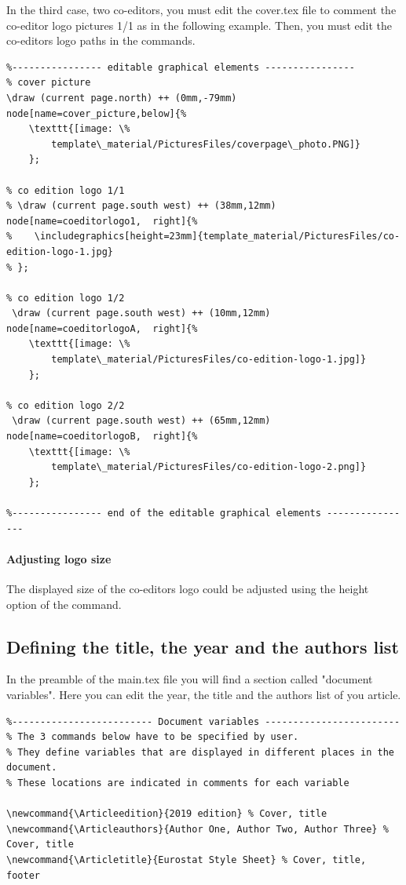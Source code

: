 \documentclass[Theme1]{{template_material/eurostat}}
\newcommand{\Articleedition}{2020 edition} %
\newcommand{\Articleauthors}{Author One, Author Two, Author Three} %
\newcommand{\Articletitle}{Eurostat {\LaTeX} Style Sheet} %
\begin{document}
In the third case, two co-editors, you must edit the cover.tex file to comment the co-editor logo pictures 1/1 as in the following example. Then, you must edit the co-editors logo paths in the  commands.
\begin{verbatim}
%---------------- editable graphical elements ----------------
% cover picture
\draw (current page.north) ++ (0mm,-79mm) node[name=cover_picture,below]{%
    \texttt{[image: \%
        template\_material/PicturesFiles/coverpage\_photo.PNG]}
    };

% co edition logo 1/1
% \draw (current page.south west) ++ (38mm,12mm) node[name=coeditorlogo1,  right]{%
%    \includegraphics[height=23mm]{template_material/PicturesFiles/co-edition-logo-1.jpg}
% }; 
     
% co edition logo 1/2
 \draw (current page.south west) ++ (10mm,12mm) node[name=coeditorlogoA,  right]{%
    \texttt{[image: \%
        template\_material/PicturesFiles/co-edition-logo-1.jpg]}
    }; 
     
% co edition logo 2/2
 \draw (current page.south west) ++ (65mm,12mm) node[name=coeditorlogoB,  right]{%
    \texttt{[image: \%
        template\_material/PicturesFiles/co-edition-logo-2.png]}
    }; 

%---------------- end of the editable graphical elements ----------------
\end{verbatim}

\paragraph{Adjusting logo size}

The displayed size of the co-editors logo could be adjusted using the height option of the  command.

\newpage
\subsection{Defining the title, the year and the authors list}

In the preamble of the main.tex file you will find a section called "document variables". Here you can edit the year, the title and the authors list of you article. 

\begin{verbatim}
%------------------------- Document variables ------------------------
% The 3 commands below have to be specified by user.
% They define variables that are displayed in different places in the document. 
% These locations are indicated in comments for each variable

\newcommand{\Articleedition}{2019 edition} % Cover, title
\newcommand{\Articleauthors}{Author One, Author Two, Author Three} % Cover, title
\newcommand{\Articletitle}{Eurostat Style Sheet} % Cover, title, footer
\end{verbatim}
\end{document}
